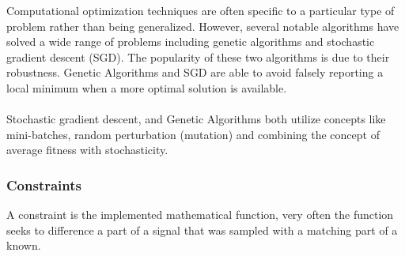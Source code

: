 
Computational optimization techniques are often specific to a particular type of problem rather than being generalized. However, several notable algorithms have solved a wide range of problems including genetic algorithms and stochastic gradient descent (SGD). The popularity of these two algorithms is due to their robustness. Genetic Algorithms and SGD are able to avoid falsely reporting a local minimum when a more optimal solution is available.\\
\\
Stochastic gradient descent, and Genetic Algorithms both utilize concepts like mini-batches, random perturbation (mutation) and combining the concept of average fitness with stochasticity. \\



\subsubsection{Constraints}
A constraint is the implemented mathematical function, very often the function seeks to difference a part of a signal that was sampled with a matching part of a known.
